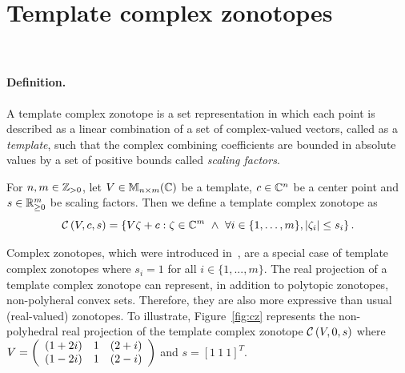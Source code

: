 \section{Template complex zonotopes}~\label{sec:tcz}
\paragraph{\bf Definition.}
A template complex zonotope is a set representation in which each point
is described as a linear combination of a set of complex-valued vectors,
called as a \textit{template}, such that the complex combining coefficients are
bounded in absolute values by a set of positive bounds called
\textit{scaling factors}.
%
\begin{defn}
  For $n,m\in\mathbb{Z}_{> 0}$, let $V\in\mathbb{M}_{n\times m}(\mathbb{C})$ be a template, $c\in\mathbb{C}^n$
  be a center point and $s\in{{\mathbb{R}}}^m_{\geq 0}$ be scaling factors.  Then we
  define a template complex zonotope as 
  \[\mathcal{C}\left(V,c,s\right)=\left\{V\zeta+c:\zeta\in\mathbb{C}^m~\wedge~\forall
  i\in\{1,\ldots,m\},|\zeta_i|\leq s_i\right\}.\]
\end{defn}
%
Complex zonotopes, which were introduced in~\cite{arvind2016lis}, are
a special case of template complex zonotopes where $s_i = 1$ for all
$i\in\{1,...,m\}$.  The real projection of a template complex zonotope
can represent, in addition to polytopic zonotopes, non-polyheral
convex sets.  Therefore, they are also more expressive than usual
(real-valued) zonotopes.  To illustrate, Figure~\ref{fig:cz}
represents the non-polyhedral real projection of the template complex
zonotope $\mathcal{C}\left(V,0,s\right)$ where $V=\left(\begin{array}{lll}(1+2i) & 1 &
  (2+i)\\(1-2i) & 1 & (2-i)\end{array}\right)$ and $s=[1~1~1]^T$.
%
